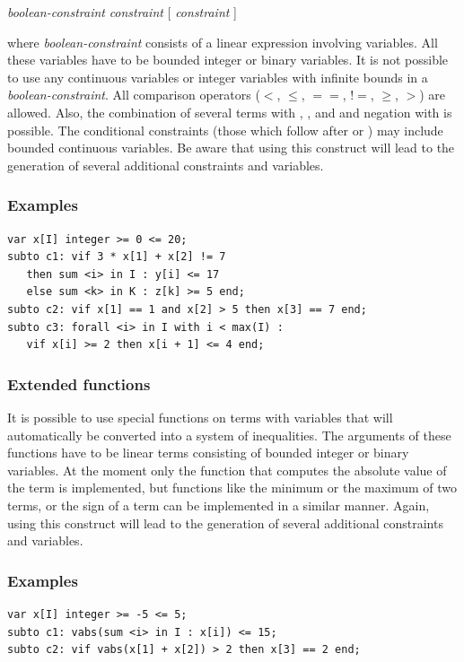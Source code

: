 \smallskip
\centerline{
 \emph{boolean-constraint}  \emph{constraint}
[  \emph{constraint} ] }

\smallskip
\noindent where \emph{boolean-constraint} consists of a linear expression involving
variables. All these variables have to be bounded integer or binary
variables. It is not possible to use any continuous variables or integer
variables with infinite bounds in a \emph{boolean-constraint}.
All comparison operators ($<$, $\le$, $==$, $!\!\!=$, $\ge$, $>$) are
allowed. Also, the combination of several terms with ,
, and  and negation with  is possible.
The conditional constraints (those which follow after  or
) may include bounded continuous variables.
Be aware that using this construct will lead to
the generation of several additional constraints and variables.

\subsubsection{Examples}
{\small
\begin{verbatim}
var x[I] integer >= 0 <= 20;
subto c1: vif 3 * x[1] + x[2] != 7
   then sum <i> in I : y[i] <= 17
   else sum <k> in K : z[k] >= 5 end;
subto c2: vif x[1] == 1 and x[2] > 5 then x[3] == 7 end;
subto c3: forall <i> in I with i < max(I) :
   vif x[i] >= 2 then x[i + 1] <= 4 end;
\end{verbatim}
}

\subsubsection{Extended functions}
It is possible to use special functions on terms with variables that
will automatically be converted into a system of inequalities. The
arguments of these functions have to be linear terms consisting of
bounded integer or binary variables. At the moment only the function
 that computes the absolute value of the term 
is implemented, but functions like the minimum or the maximum of two
terms, or the sign of a term can be implemented in a similar manner.
Again, using this construct will lead to
the generation of several additional constraints and variables.

\subsubsection{Examples}
{\small
\begin{verbatim}
var x[I] integer >= -5 <= 5;
subto c1: vabs(sum <i> in I : x[i]) <= 15;
subto c2: vif vabs(x[1] + x[2]) > 2 then x[3] == 2 end;
\end{verbatim}
}




